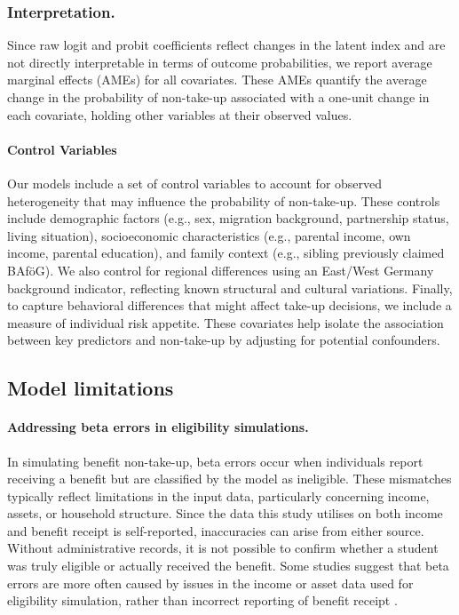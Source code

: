 \subsubsection{Interpretation.} %
Since raw logit and probit coefficients reflect changes in the latent index and are not directly interpretable in terms of outcome probabilities, we report average marginal effects (AMEs) for all covariates. These AMEs quantify the average change in the probability of non-take-up associated with a one-unit change in each covariate, holding other variables at their observed values.

\paragraph{Control Variables}
Our models include a set of control variables to account for observed heterogeneity that may influence the probability of non-take-up. These controls include demographic factors (e.g., sex, migration background, partnership status, living situation), socioeconomic characteristics (e.g., parental income, own income, parental education), and family context (e.g., sibling previously claimed BAföG). We also control for regional differences using an East/West Germany background indicator, reflecting known structural and cultural variations. Finally, to capture behavioral differences that might affect take-up decisions, we include a measure of individual risk appetite. These covariates help isolate the association between key predictors and non-take-up by adjusting for potential confounders.


\subsection{Model limitations}
\label{subsection:model_limitations}

\paragraph{Addressing beta errors in eligibility simulations.}
In simulating benefit non-take-up, beta errors occur when individuals report receiving a benefit but are classified by the model as ineligible. These mismatches typically reflect limitations in the input data, particularly concerning income, assets, or household structure. Since the data this study utilises on both income and benefit receipt is self-reported, inaccuracies can arise from either source. Without administrative records, it is not possible to confirm whether a student was truly eligible or actually received the benefit. Some studies suggest that beta errors are more often caused by issues in the income or asset data used for eligibility simulation, rather than incorrect reporting of benefit receipt \citep{frick_claim_2007, janssens_takemod_2022}.

